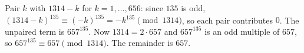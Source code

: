 Pair $k$ with $1314-k$ for $k=1,\dots,656$: since $135$ is odd, $(1314-k)^{135}\equiv(-k)^{135}=-k^{135}\pmod{1314}$, so each pair contributes $0$. The unpaired term is $657^{135}$. Now $1314=2\cdot657$ and $657^{135}$ is an odd multiple of $657$, so $657^{135}\equiv657\pmod{1314}$. The remainder is $\boxed{657}$.
